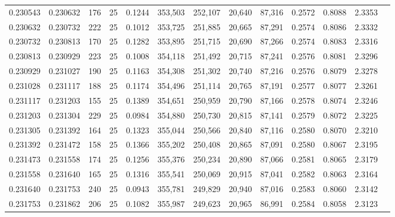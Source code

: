 \begin{tabular}{rrrrrrrrrrrrr}
0.230543 & 0.230632 &   176 &  25 &                                     0.1244 & 353,503 & 252,107 &  20,640 &  87,316 & 0.2572 & 0.8088 & 2.3353 \\
0.230632 & 0.230732 &   222 &  25 &                                     0.1012 & 353,725 & 251,885 &  20,665 &  87,291 & 0.2574 & 0.8086 & 2.3332 \\
0.230732 & 0.230813 &   170 &  25 &                                     0.1282 & 353,895 & 251,715 &  20,690 &  87,266 & 0.2574 & 0.8083 & 2.3316 \\
0.230813 & 0.230929 &   223 &  25 &                                     0.1008 & 354,118 & 251,492 &  20,715 &  87,241 & 0.2576 & 0.8081 & 2.3296 \\
0.230929 & 0.231027 &   190 &  25 &                                     0.1163 & 354,308 & 251,302 &  20,740 &  87,216 & 0.2576 & 0.8079 & 2.3278 \\
0.231028 & 0.231117 &   188 &  25 &                                     0.1174 & 354,496 & 251,114 &  20,765 &  87,191 & 0.2577 & 0.8077 & 2.3261 \\
0.231117 & 0.231203 &   155 &  25 &                                     0.1389 & 354,651 & 250,959 &  20,790 &  87,166 & 0.2578 & 0.8074 & 2.3246 \\
0.231203 & 0.231304 &   229 &  25 &                                     0.0984 & 354,880 & 250,730 &  20,815 &  87,141 & 0.2579 & 0.8072 & 2.3225 \\
0.231305 & 0.231392 &   164 &  25 &                                     0.1323 & 355,044 & 250,566 &  20,840 &  87,116 & 0.2580 & 0.8070 & 2.3210 \\
0.231392 & 0.231472 &   158 &  25 &                                     0.1366 & 355,202 & 250,408 &  20,865 &  87,091 & 0.2580 & 0.8067 & 2.3195 \\
0.231473 & 0.231558 &   174 &  25 &                                     0.1256 & 355,376 & 250,234 &  20,890 &  87,066 & 0.2581 & 0.8065 & 2.3179 \\
0.231558 & 0.231640 &   165 &  25 &                                     0.1316 & 355,541 & 250,069 &  20,915 &  87,041 & 0.2582 & 0.8063 & 2.3164 \\
0.231640 & 0.231753 &   240 &  25 &                                     0.0943 & 355,781 & 249,829 &  20,940 &  87,016 & 0.2583 & 0.8060 & 2.3142 \\
0.231753 & 0.231862 &   206 &  25 &                                     0.1082 & 355,987 & 249,623 &  20,965 &  86,991 & 0.2584 & 0.8058 & 2.3123 \\

\end{tabular}
